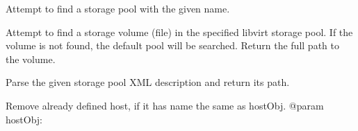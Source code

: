 \documentclass[a4paper,11pt,openany]{sphinxmanual}
\begin{document}
\begin{fulllineitems}
\begin{fulllineitems}
\end{fulllineitems}


\begin{fulllineitems}
\label{ref-manual/XrdTest:XrdTest.ClusterManager.ClusterManager.findStoragePool}
Attempt to find a storage pool with the given name.

\end{fulllineitems}


\begin{fulllineitems}
\label{ref-manual/XrdTest:XrdTest.ClusterManager.ClusterManager.findStorageVolume}
Attempt to find a storage volume (file) in the specified libvirt storage
pool. If the volume is not found, the default pool will be searched. Return
the full path to the volume.

\end{fulllineitems}


\begin{fulllineitems}
\label{ref-manual/XrdTest:XrdTest.ClusterManager.ClusterManager.getPoolPath}
Parse the given storage pool XML description and return its
path.

\end{fulllineitems}


\begin{fulllineitems}
\label{ref-manual/XrdTest:XrdTest.ClusterManager.ClusterManager.removeCluster}
\end{fulllineitems}


\begin{fulllineitems}
\label{ref-manual/XrdTest:XrdTest.ClusterManager.ClusterManager.removeDanglingHost}
Remove already defined host, if it has name the same as hostObj.
@param hostObj:


\end{fulllineitems}
\end{fulllineitems}
\end{document}
